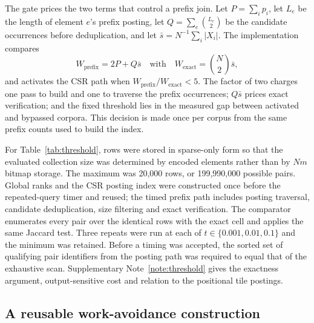 The gate prices the two terms that control a prefix join. Let $P=\sum_i p_i$, let $L_e$ be the
length of element $e$'s prefix posting, let
$Q=\sum_e\binom{L_e}{2}$ be the candidate occurrences before deduplication, and let
$\bar s=N^{-1}\sum_i|X_i|$. The implementation compares
\begin{equation}
W_{\mathrm{prefix}}=2P+Q\bar s
\quad\text{with}\quad
W_{\mathrm{exact}}=\binom{N}{2}\bar s,
\label{eq:prefix-gate}
\end{equation}
and activates the CSR path when
$W_{\mathrm{prefix}}/W_{\mathrm{exact}}<5$. The factor of two charges one pass to build and one to
traverse the prefix occurrences; $Q\bar s$ prices exact verification; and the fixed threshold lies in
the measured gap between activated and bypassed corpora. This decision is made once per corpus from
the same prefix counts used to build the index.

For Table~\ref{tab:threshold}, rows were stored in sparse-only form so that the evaluated collection
size was determined by encoded elements rather than by $Nm$ bitmap storage. The maximum was 20,000
rows, or 199,990,000 possible pairs. Global ranks and the CSR posting index were constructed once
before the repeated-query timer and reused; the timed prefix path includes posting traversal,
candidate deduplication, size filtering and exact verification. The comparator enumerates every pair
over the identical rows with the exact \cell{\rS}{\rS} cell and applies the same Jaccard test. Three
repeats were run at each of $t\in\{0.001,0.01,0.1\}$ and the minimum was retained. Before a timing was
accepted, the sorted set of qualifying pair identifiers from the posting path was required to equal
that of the exhaustive scan. Supplementary Note~\ref{note:threshold} gives the exactness argument,
output-sensitive cost and relation to the positional tile postings.

\subsection*{A reusable work-avoidance construction}

